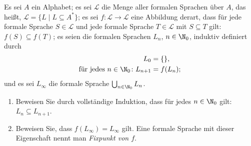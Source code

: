 \documentclass[12pt]{article}
\begin{document}


\begin{aufgabe}[2 + 2 + (2 + 1 + 1 + 2) + 2 + 2 = 14]
  Es sei $A$ ein Alphabet; es sei $\mathcal{L}$ die Menge aller formalen Sprachen über $A$, das heißt, $\mathcal{L} = \{L \mid L \subseteq A^*\}$; es sei $f \colon \mathcal{L} \to \mathcal{L}$ eine Abbildung derart, dass für jede formale Sprache $S \in \mathcal{L}$ und jede formale Sprache $T \in \mathcal{L}$ mit $S \subseteq T$ gilt: $f(S) \subseteq f(T)$; es seien die formalen Sprachen $L_n$, $n \in \N_0$, induktiv definiert durch
  \begin{align*}
    L_0 &= \{\},\\
    \text{für jedes } n \in \N_0 \colon L_{n + 1} &= f(L_n);
  \end{align*}
  und es sei $L_\infty$ die formale Sprache $\bigcup_{n \in \N_0} L_n$.
  \begin{enumerate}
    \item Beweisen Sie durch vollständige Induktion, dass für jedes $n \in \N_0$ gilt: $L_n \subseteq L_{n + 1}$.
    \item Beweisen Sie, dass $f(L_\infty) = L_\infty$ gilt. Eine formale Sprache mit dieser Eigenschaft nennt man \emph{Fixpunkt von $f$}.


\end{enumerate}
\end{aufgabe}
\end{document}
